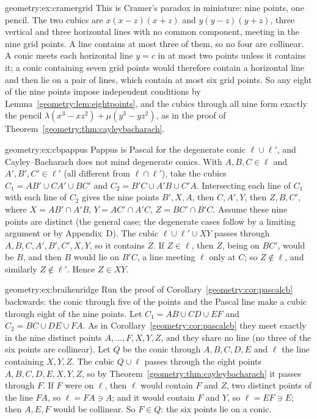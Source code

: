 \begin{solution}{geometry:ex:cramergrid}
\idea This is Cramer's paradox in miniature: nine points, one pencil.
\writeup The two cubics are $x(x-z)(x+z)$ and $y(y-z)(y+z)$, three vertical and three horizontal lines with no common component, meeting in the nine grid
points. A line contains at most three of them, so no four are collinear. A conic meets each horizontal line $y=c$ in at most two points unless it contains it; a
conic containing seven grid points would therefore contain a horizontal line and then lie on a pair of lines, which contain at most six grid points. So
any eight of the nine points impose independent conditions by Lemma~\ref{geometry:lem:eightpoints}, and the cubics through all nine form exactly the pencil
$\lambda(x^3-xz^2)+\mu(y^3-yz^2)$, as in the proof of Theorem~\ref{geometry:thm:cayleybacharach}.
\end{solution}

\begin{solution}{geometry:ex:cbpappus}
\idea Pappus is Pascal for the degenerate conic $\ell\cup\ell'$, and Cayley--Bacharach does not mind degenerate conics.
\writeup With $A,B,C\in\ell$ and $A',B',C'\in\ell'$ (all different from $\ell\cap\ell'$), take the cubics $C_1=AB'\cup CA'\cup BC'$ and $C_2=B'C\cup A'B\cup C'A$.
Intersecting each line of $C_1$ with each line of $C_2$ gives the nine points $B',X,A$, then $C,A',Y$, then $Z,B,C'$, where $X=AB'\cap A'B$, $Y=AC'\cap A'C$,
$Z=BC'\cap B'C$. Assume these nine points are distinct (the general case; the degenerate cases follow by a limiting argument or by Appendix~D). The cubic
$\ell\cup\ell'\cup XY$ passes through $A,B,C,A',B',C',X,Y$, so it contains $Z$. If $Z\in\ell$, then $Z$, being on $BC'$, would be $B$, and then $B$ would lie on
$B'C$, a line meeting $\ell$ only at $C$; so $Z\notin\ell$, and similarly $Z\notin\ell'$. Hence $Z\in XY$.
\end{solution}

\begin{solution}{geometry:ex:braikenridge}
\idea Run the proof of Corollary~\ref{geometry:cor:pascalcb} backwards: the conic through five of the points and the Pascal line make a cubic through eight of the nine points.
\writeup Let $C_1=AB\cup CD\cup EF$ and $C_2=BC\cup DE\cup FA$. As in Corollary~\ref{geometry:cor:pascalcb} they meet exactly in the nine distinct points
$A,\dots,F,X,Y,Z$, and they share no line (no three of the six points are collinear). Let $Q$ be the conic through $A,B,C,D,E$ and $\ell$ the line containing
$X,Y,Z$. The cubic $Q\cup\ell$ passes through the eight points $A,B,C,D,E,X,Y,Z$, so by Theorem~\ref{geometry:thm:cayleybacharach} it passes through $F$. If $F$ were on
$\ell$, then $\ell$ would contain $F$ and $Z$, two distinct points of the line $FA$, so $\ell=FA\ni A$; and it would contain $F$ and $Y$, so $\ell=EF\ni E$; then
$A,E,F$ would be collinear. So $F\in Q$: the six points lie on a conic.
\end{solution}

